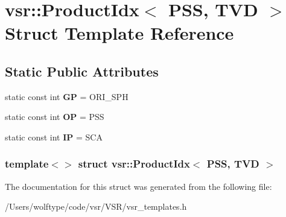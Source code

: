 \hypertarget{structvsr_1_1_product_idx_3_01_p_s_s_00_01_t_v_d_01_4}{\section{vsr\-:\-:Product\-Idx$<$ P\-S\-S, T\-V\-D $>$ Struct Template Reference}
\label{structvsr_1_1_product_idx_3_01_p_s_s_00_01_t_v_d_01_4}
}
\subsection*{Static Public Attributes}
\begin{DoxyCompactItemize}
\item 
\hypertarget{structvsr_1_1_product_idx_3_01_p_s_s_00_01_t_v_d_01_4_af5e2564cb724853d2879add4e001781c}{static const int {\bfseries G\-P} = O\-R\-I\-\_\-\-S\-P\-H}\label{structvsr_1_1_product_idx_3_01_p_s_s_00_01_t_v_d_01_4_af5e2564cb724853d2879add4e001781c}

\item 
\hypertarget{structvsr_1_1_product_idx_3_01_p_s_s_00_01_t_v_d_01_4_a15bf0110d4cd8fe0354e8bf2b71911c5}{static const int {\bfseries O\-P} = P\-S\-S}\label{structvsr_1_1_product_idx_3_01_p_s_s_00_01_t_v_d_01_4_a15bf0110d4cd8fe0354e8bf2b71911c5}

\item 
\hypertarget{structvsr_1_1_product_idx_3_01_p_s_s_00_01_t_v_d_01_4_a3550eae701085fdd9209c81998fcf296}{static const int {\bfseries I\-P} = S\-C\-A}\label{structvsr_1_1_product_idx_3_01_p_s_s_00_01_t_v_d_01_4_a3550eae701085fdd9209c81998fcf296}

\end{DoxyCompactItemize}
\subsubsection*{template$<$$>$ struct vsr\-::\-Product\-Idx$<$ P\-S\-S, T\-V\-D $>$}



The documentation for this struct was generated from the following file\-:\begin{DoxyCompactItemize}
\item 
/\-Users/wolftype/code/vsr/\-V\-S\-R/vsr\-\_\-templates.\-h\end{DoxyCompactItemize}

